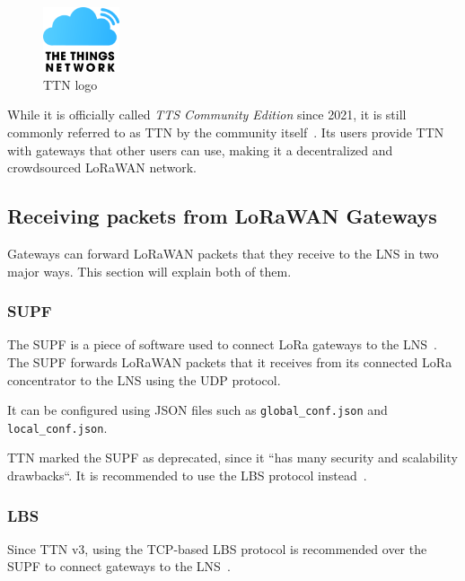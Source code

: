 \begin{figure}[htbp]
    \centering
    \includegraphics[width=0.2\textwidth]{pictures/logos/TTN-logo.eps}
    \caption{\acf{TTN} logo~\protect\cite{the_things_industries_bv_quick_nodate}}
\end{figure}


While it is officially called \emph{\acl{TTS} Community Edition} since 2021, it is still commonly referred to as \acf{TTN} by the community itself~\cite{the_things_industries_bv_what_2022}.
Its users provide \ac{TTN} with gateways that other users can use, making it a decentralized and crowdsourced \ac{LoRaWAN} network.

\subsection{Receiving packets from \acs{LoRaWAN} Gateways}

Gateways can forward \ac{LoRaWAN} packets that they receive to the \ac{LNS} in two major ways.
This section will explain both of them.

\subsubsection{\acf{SUPF}}

The \ac{SUPF} is a piece of software used to connect \ac{LoRa} gateways to the \ac{LNS}~\cite{the_things_industries_bv_semtech_2022}.
The \ac{SUPF} forwards \ac{LoRaWAN} packets that it receives from its connected \ac{LoRa} concentrator to the \ac{LNS} using the \ac{UDP} protocol.

It can be configured using JSON files such as \lstinline{global_conf.json} and \lstinline{local_conf.json}.

\ac{TTN} marked the \acl{SUPF} as deprecated, since it ``has many security and scalability drawbacks``.
It is recommended to use the \ac{LBS} protocol instead~\cite{the_things_industries_bv_semtech_2022}.

\subsubsection{\acf{LBS}}\label{sec:lorawan-lbs}

Since \ac{TTN} v3, using the \ac{TCP}-based \acl{LBS} protocol is recommended over the \ac{SUPF} to connect gateways to the \ac{LNS}~\cite{the_things_industries_bv_semtech_2022}.

